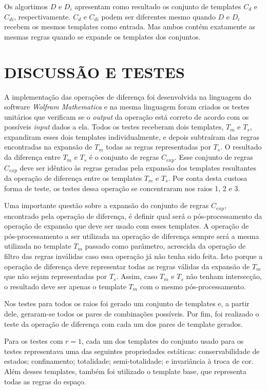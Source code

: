 Os algortimos $D$ e $D_i$ apresentam como resultado os conjunto de templates $C_d$ e $C_{di}$, respectivamente. $C_d$ e $C_{di}$ podem ser diferentes mesmo quando $D$ e $D_i$ recebem os mesmos templates como entrada. Mas ambos contém exatamente as mesmas regras quando se expande os templates dos conjuntos.

\section{DISCUSSÃO E TESTES}
\label{sec:discussoesETestes}
A implementação das operações de diferença foi desenvolvida na linguagem do software \textit{Wolfram Mathematica} \cite{woframMathematica10} e na mesma linguagem foram criados os testes unitários que verificam se o \textit{output} da operação está correto de acordo com os possíveis \textit{input} dados a ela. Todos os testes receberam dois templates, $T_m$ e $T_s$, expandiram esses dois templates individualmente, e depois subtraíram das regras encontradas na expansão de $T_m$ todas as regras representadas por $T_s$. O resultado da diferença entre $T_m$ e $T_s$ é o conjunto de regras $C_{exp}$. Esse conjunto de regras $C_{exp}$ deve ser idêntico às regras geradas pela expansão dos templates resultantes da operação de diferença entre os templates $T_m$ e $T_s$. Por conta desta custosa forma de teste, os testes dessa operação se concentraram nos raios 1, 2 e 3.


Uma importante questão sobre a expansão do conjunto de regras $C_{exp}$, encontrado pela operação de diferença, é definir qual será o pós-processamento da operação de expansão que deve ser usado com esses templates. A operação de pós-processamento a ser utilizada na operação de diferença sempre será a mesma utilizada no template $T_m$ passado como parâmetro, acrescida da operação de filtro das regras inválidas caso essa operação já não tenha sido feita. Isto porque a operação de diferença deve representar todas as regras válidas da expansão de $T_m$ que não sejam representadas por $T_s$. Assim, caso $T_m$ e $T_s$ não tenham intersecção, o resultado deve ser apenas o template $T_m$ com o mesmo pós-processamento.

Nos testes para todos os raios foi gerado um conjunto de templates e, a partir dele, geraram-se todos os pares de combinações possíveis. Por fim, foi realizado o teste da operação de diferença com cada um dos pares de template gerados.

Para os testes com $r = 1$, cada um dos templates do conjunto usado para os testes representava uma das seguintes propriedades estáticas: conservabilidade de estados; confinamento; totalidade; semi-totalidade; e invariância  à troca de cor. Além desses templates, também foi utilizado o template base, que representa todas as regras do espaço.


